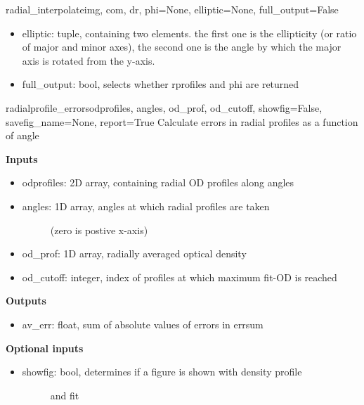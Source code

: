 \documentclass[letterpaper,10pt,english]{manual}
\begin{document}
\begin{funcdesc}{radial\_interpolate}{img, com, dr, phi=None, elliptic=None, full\_output=False}
\begin{itemize}
\begin{description}
\end{description}

\item {} 
elliptic: tuple, containing two elements. the first one is the
ellipticity (or ratio of major and minor axes), the second one is the
angle by which the major axis is rotated from the y-axis.

\item {} 
full\_output: bool, selects whether rprofiles and phi are returned

\end{itemize}
\end{funcdesc}

\hypertarget{odysseus.imageprocess.radialprofile_errors}{}\begin{funcdesc}{radialprofile\_errors}{odprofiles, angles, od\_prof, od\_cutoff, showfig=False, savefig\_name=None, report=True}
Calculate errors in radial profiles as a function of angle

\textbf{Inputs}
\begin{itemize}
\item {} 
odprofiles: 2D array, containing radial OD profiles along angles

\item {} \begin{description}
\item[angles: 1D array, angles at which radial profiles are taken] \leavevmode
(zero is postive x-axis)

\end{description}

\item {} 
od\_prof: 1D array, radially averaged optical density

\item {} 
od\_cutoff: integer, index of profiles at which maximum fit-OD is reached

\end{itemize}

\textbf{Outputs}
\begin{itemize}
\item {} 
av\_err: float, sum of absolute values of errors in errsum

\end{itemize}

\textbf{Optional inputs}
\begin{itemize}
\item {} \begin{description}
\item[showfig: bool, determines if a figure is shown with density profile] \leavevmode
and fit


\end{description}
\end{itemize}
\end{funcdesc}
\end{document}
